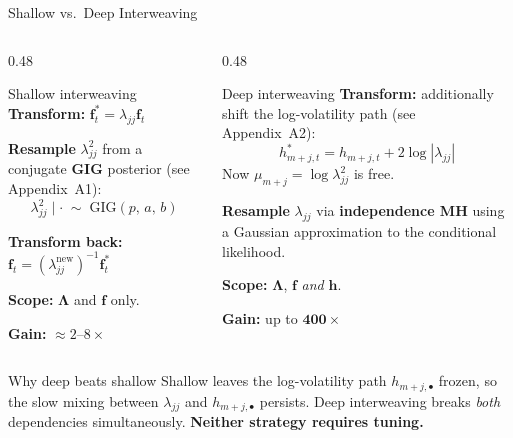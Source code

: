 \documentclass[10pt]{beamer}\usepackage[]{graphicx}\usepackage[table]{xcolor}
\begin{document}

\begin{frame}{Shallow vs.\ Deep Interweaving}

  \begin{columns}[T]
    \begin{column}{0.48\textwidth}
      \begin{alertblock}{Shallow interweaving}
        \textbf{Transform:}
        $\mathbf{f}_t^* = \lambda_{jj}\mathbf{f}_t$

        \vspace{0.1em}
        \textbf{Resample} $\lambda_{jj}^2$ from a conjugate
        \textbf{GIG} posterior (see Appendix~A1):
        \[
          \lambda_{jj}^2 \mid \cdot \;\sim\;
          \mathrm{GIG}(p,\,a,\,b)
        \]

        \vspace{0.1em}
        \textbf{Transform back:}
        $\mathbf{f}_t = (\lambda_{jj}^{\mathrm{new}})^{-1}\mathbf{f}_t^*$

        \vspace{0.1em}
        \textbf{Scope:} $\boldsymbol{\Lambda}$ and $\mathbf{f}$ only.

        \vspace{0.3em}
        \textbf{Gain:} $\approx 2$--$8\times$
      \end{alertblock}
    \end{column}
    \begin{column}{0.48\textwidth}
      \begin{alertblock}{Deep interweaving}
        \textbf{Transform:} additionally shift the
        log-volatility path (see Appendix~A2):
        \[
          h^*_{m+j,t} = h_{m+j,t} + 2\log|\lambda_{jj}|
        \]
        Now $\mu_{m+j} = \log\lambda_{jj}^2$ is free.

        \vspace{0.3em}
        \textbf{Resample} $\lambda_{jj}$ via
        \textbf{independence MH} using a Gaussian
        approximation to the conditional likelihood.

        \vspace{0.3em}
        \textbf{Scope:} $\boldsymbol{\Lambda}$, $\mathbf{f}$
        \emph{and} $\mathbf{h}$.

        \vspace{0.3em}
        \textbf{Gain:} up to $\mathbf{400\times}$
      \end{alertblock}
    \end{column}
  \end{columns}

  \vspace{0.2em}

  \begin{block}{Why deep beats shallow}
    Shallow leaves the log-volatility path $h_{m+j,\bullet}$ frozen,
    so the slow mixing between $\lambda_{jj}$ and $h_{m+j,\bullet}$
    persists.  Deep interweaving breaks \emph{both} dependencies
    simultaneously.  \textbf{Neither strategy requires tuning.}
  \end{block}

\end{frame}
\end{document}
